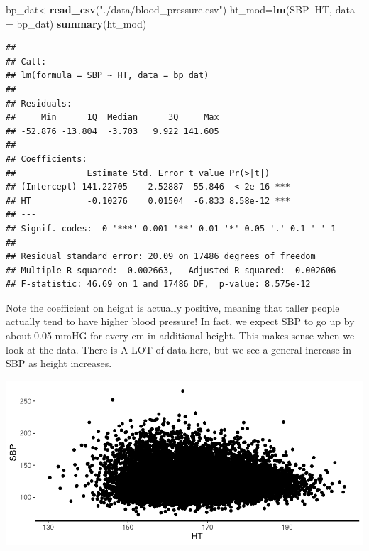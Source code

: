\documentclass[]{book}
\newenvironment{Shaded}{\begin{snugshade}}{\end{snugshade}}
\newcommand{\DataTypeTok}[1]{\textcolor[rgb]{0.13,0.29,0.53}{#1}}
\newcommand{\KeywordTok}[1]{\textcolor[rgb]{0.13,0.29,0.53}{\textbf{#1}}}
\newcommand{\NormalTok}[1]{#1}
\newcommand{\OperatorTok}[1]{\textcolor[rgb]{0.81,0.36,0.00}{\textbf{#1}}}
\newcommand{\StringTok}[1]{\textcolor[rgb]{0.31,0.60,0.02}{#1}}
\begin{document}
\begin{Shaded}
\begin{Highlighting}[]
\NormalTok{bp_dat<-}\KeywordTok{read_csv}\NormalTok{(}\StringTok{"./data/blood_pressure.csv"}\NormalTok{)}
\NormalTok{ht_mod=}\KeywordTok{lm}\NormalTok{(SBP}\OperatorTok{~}\NormalTok{HT,}
         \DataTypeTok{data =}\NormalTok{ bp_dat)}
\KeywordTok{summary}\NormalTok{(ht_mod)}
\end{Highlighting}
\end{Shaded}

\begin{verbatim}
## 
## Call:
## lm(formula = SBP ~ HT, data = bp_dat)
## 
## Residuals:
##     Min      1Q  Median      3Q     Max 
## -52.876 -13.804  -3.703   9.922 141.605 
## 
## Coefficients:
##              Estimate Std. Error t value Pr(>|t|)    
## (Intercept) 141.22705    2.52887  55.846  < 2e-16 ***
## HT           -0.10276    0.01504  -6.833 8.58e-12 ***
## ---
## Signif. codes:  0 '***' 0.001 '**' 0.01 '*' 0.05 '.' 0.1 ' ' 1
## 
## Residual standard error: 20.09 on 17486 degrees of freedom
## Multiple R-squared:  0.002663,   Adjusted R-squared:  0.002606 
## F-statistic: 46.69 on 1 and 17486 DF,  p-value: 8.575e-12
\end{verbatim}

Note the coefficient on height is actually positive, meaning that taller people actually tend to have higher blood pressure! In fact, we expect SBP to go up by about 0.05 mmHG for every cm in additional height. This makes sense when we look at the data. There is A LOT of data here, but we see a general increase in SBP as height increases.

\begin{Shaded}
\end{Shaded}

\includegraphics{MA206supplement_files/figure-latex/unnamed-chunk-4-1.pdf}
\end{document}
